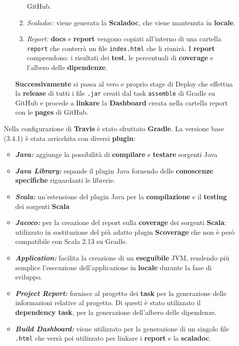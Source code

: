 \begin{itemize}
\begin{enumerate}
\begin{enumerate}
	                GitHub.
	                \item \textit{Scaladoc:} viene generata la \textbf{Scaladoc}, che viene mantenuta in \textbf{locale}.
	                \item \textit{Report:} \textbf{docs} e \textbf{report} vengono copiati all'interno di una cartella \texttt{report} che conterrà un file \texttt{index.html} che li riunirà. I \textbf{report} comprendono: i risultati dei \textbf{test}, le percentuali di \textbf{coverage} e l'albero delle \textbf{dipendenze}.
	            \end{enumerate}
	            \textbf{Successivamente} si passa al vero e proprio stage di Deploy che effettua la \textbf{release} di tutti i file \texttt{.jar} creati dal task \texttt{assemble} di Gradle su GitHub e procede a \textbf{linkare} la \textbf{Dashboard} creata nella cartella report con le \textbf{pages} di GitHub.
	    \end{enumerate}
	    Nella configurazione di \textbf{Travis} è stato sfruttato \textbf{Gradle}. La versione base (3.4.1) è stata arricchita con diversi \textbf{plugin}:
	   \begin{itemize}
	   		\item \textit{\textbf{Java:}} aggiunge la possibilità di \textbf{compilare} e \textbf{testare} sorgenti Java
	   		\item \textit{\textbf{Java Library:}} espande il plugin Java fornendo delle \textbf{conoscenze specifiche} riguardanti le librerie. 
	   		\item \textit{\textbf{Scala:}} un'estensione del plugin Java per la \textbf{compilazione} e il \textbf{testing} dei sorgenti \textbf{Scala}
	   		\item \textit{\textbf{Jacoco:}} per la creazione del report sulla \textbf{coverage} dei sorgenti \textbf{Scala}; utilizzato in sostituzione del più adatto plugin \textbf{Scoverage} che non è però compatibile con Scala 2.13 su Gradle. 
	   		\item \textit{\textbf{Application:}} facilita la creazione di un \textbf{eseguibile} JVM, rendendo più semplice l'esecuzione dell'applicazione in \textbf{locale} durante la fase di sviluppo. 
	   		\item \textit{\textbf{Project Report:}} fornisce al progetto dei \textbf{task} per la generazione delle informazioni relative al progetto. Di questi è stato utilizzato il \textbf{dependency task}, per la generazione dell'albero delle dipendenze.
	   		\item \textit{\textbf{Build Dashboard:}} viene utilizzato per la generazione di un singolo file \texttt{.html} che verrà poi utilizzato per linkare i \textbf{report} e  la \textbf{scaladoc}.

\end{itemize}
\end{itemize}
